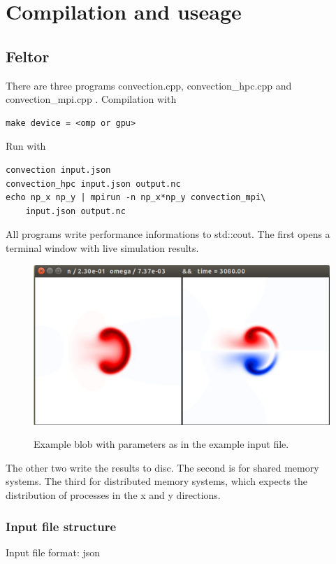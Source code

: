 \documentclass{hitec} %
\begin{document}
\section{Compilation and useage}

\subsection{Feltor}
There are three programs convection.cpp, convection\_hpc.cpp and convection\_mpi.cpp . Compilation with
\begin{verbatim}
make device = <omp or gpu>
\end{verbatim}
Run with
\begin{verbatim}
convection input.json
convection_hpc input.json output.nc
echo np_x np_y | mpirun -n np_x*np_y convection_mpi\
    input.json output.nc
\end{verbatim}
All programs write performance informations to std::cout.
The first opens a terminal window with live simulation results.
\begin{figure}[htpb]
\centering
\includegraphics[trim = 0px 0px 0px 0px, clip, scale=0.4]{./blob}\label{fig:example}
\caption{
  Example blob with parameters as in the example input file.
}
\end{figure}
The other two write the results to disc.
The second is for shared memory systems. The third for distributed
memory systems, which expects the distribution of processes in the
x and y directions.

\subsubsection{Input file structure}
Input file format: json
\end{document}
